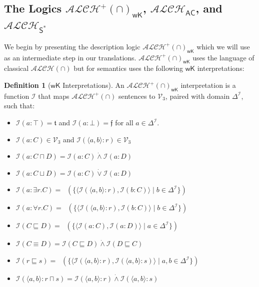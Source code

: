 \documentclass[letterpaper]{article} %
\theoremstyle{definition}
\theoremstyle{definition}
\newtheorem{definition}{Definition}
\theoremstyle{definition}
\theoremstyle{definition}
\theoremstyle{definition}
\newcommand{\strongneg}{\mathord{\sim}}
\newcommand{\isa}{\mathbin{{:}}}
\newcommand{\vf}{\mathfrak{f}}
\begin{document}
\subsection{The Logics $\mathcal{ALCH^+(\cap)}_\mathsf{wK}$, $\mathcal{ALCH}_\mathsf{AC}$, and $\mathcal{ALCH}_{\mathsf{S}^*}$}

We begin by presenting the description logic  $\mathcal{ALCH^+(\cap)}_\mathsf{wK}$ which we will use as an intermediate step in our translations. $\mathcal{ALCH^+(\cap)}_\mathsf{wK}$ uses the language of classical $\mathcal{ALCH(\cap)}$ but for semantics uses the following $\mathsf{wK}$ interpretations:

\begin{definition}[$\mathsf{wK}$ Interpretations]\label{def:wK-Interp}
An $\mathcal{ALCH^+(\cap)}_\mathsf{wK}$ interpretation is a function $\mathcal{I}$ that maps $\mathcal{ALCH^+(\cap)}$ sentences to $\mathcal{V}_3$, paired with domain $\Delta^{\mathcal{I}}$, such that:
	\begin{itemize}
		\item $\mathcal{I}(a:\top)=\mathfrak{t}$ and $\mathcal{I}(a : \bot) = \vf$ for all $a\in\Delta^{\mathcal{I}}$.
		\item $\mathcal{I}(a\isa C)\in\mathcal{V}_{3}$ and $\mathcal{I}(\langle a,b\rangle\isa r)\in\mathcal{V}_{3}$
		\item $\mathcal{I}(a\isa C\sqcap D)=\mathcal{I}(a\isa C)\mathrel{\dot{\wedge}}\mathcal{I}(a\isa D)$
		\item $\mathcal{I}(a\isa C\sqcup D)=\mathcal{I}(a\isa C)\mathrel{\dot{\vee}}\mathcal{I}(a\isa D)$
		\item $\mathcal{I}(a\isa \exists r.C)=\mathop{\dot{\exists}}(\lbrace\langle\mathcal{I}(\langle a,b\rangle\isa r),\mathcal{I}(b\isa C)\rangle\mid b\in \Delta^{\mathcal{I}}\rbrace)$
		\item $\mathcal{I}(a\isa \forall r.C)=\mathop{\dot{\forall}}(\lbrace\langle\mathcal{I}(\langle a,b\rangle\isa r),\mathcal{I}(b\isa C)\rangle\mid b\in \Delta^{\mathcal{I}}\rbrace)$
		\item $\mathcal{I}(C\sqsubseteq D)=\mathop{\dot{\forall}}(\lbrace\langle\mathcal{I}(a\isa C),\mathcal{I}(a\isa D)\rangle\mid a\in \Delta^{\mathcal{I}}\rbrace)$
		\item $\mathcal{I}(C\equiv D)=\mathcal{I}(C\sqsubseteq D)\mathrel{\dot{\wedge}}\mathcal{I}(D\sqsubseteq C)$
        \item $\mathcal{I}(r \sqsubseteq s) = \mathop{\dot{\forall}}(\lbrace\langle\mathcal{I}(\langle a,b\rangle\isa r),\mathcal{I}(\langle a,b\rangle\isa s)\rangle\mid a,b\in \Delta^{\mathcal{I}}\rbrace)$
        \item $\mathcal{I}(\langle a, b\rangle : r \sqcap s) = \mathcal{I}(\langle a, b\rangle : r) \mathrel{\dot{\wedge}} \mathcal{I}(\langle a, b\rangle : s)$
	\end{itemize}
\end{definition}
\end{document}
